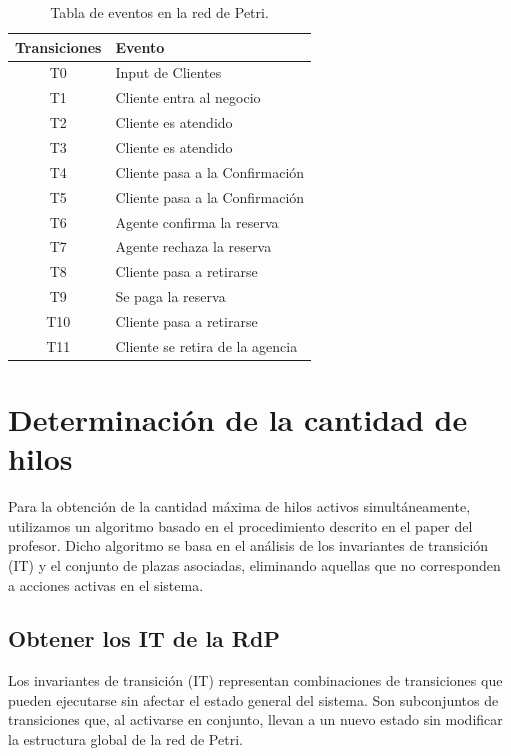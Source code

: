 \documentclass[12pt]{article}
\begin{document}
\begin{table}[H]
    \centering
    \renewcommand{\arraystretch}{1.2}
    \begin{tabularx}{\textwidth}{|c|X|}
    \hline
    \rowcolor{green!20}
    \textbf{Transiciones} & \textbf{Evento} \\ \hline
    T0  & Input de Clientes                \\ \hline
    T1  & Cliente entra al negocio         \\ \hline
    T2  & Cliente es atendido              \\ \hline
    T3  & Cliente es atendido              \\ \hline
    T4  & Cliente pasa a la Confirmación   \\ \hline
    T5  & Cliente pasa a la Confirmación   \\ \hline
    T6  & Agente confirma la reserva       \\ \hline
    T7  & Agente rechaza la reserva        \\ \hline
    T8  & Cliente pasa a retirarse         \\ \hline
    T9  & Se paga la reserva               \\ \hline
    T10 & Cliente pasa a retirarse         \\ \hline
    T11 & Cliente se retira de la agencia  \\ \hline
    \end{tabularx}
    \caption{Tabla de eventos en la red de Petri.}
    \label{tabla:eventos-red-petri}
\end{table}


\section{Determinación de la cantidad de hilos}

Para la obtención de la cantidad máxima de hilos activos simultáneamente, utilizamos un algoritmo basado en el procedimiento descrito en el paper del profesor. Dicho algoritmo se basa en el análisis de los invariantes de transición (IT) y el conjunto de plazas asociadas, eliminando aquellas que no corresponden a acciones activas en el sistema.

\subsection{Obtener los IT de la RdP}

Los invariantes de transición (IT) representan combinaciones de transiciones que pueden ejecutarse sin afectar el estado general del sistema. Son subconjuntos de transiciones que, al activarse en conjunto, llevan a un nuevo estado sin modificar la estructura global de la red de Petri.
\end{document}
